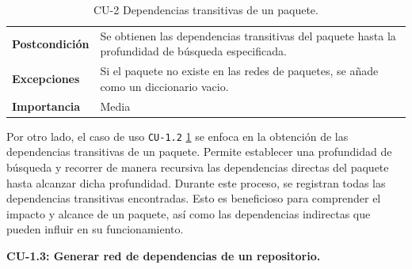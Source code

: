 \begin{table}[p]
\begin{tabularx}{\linewidth}{ p{} p{} }
		\textbf{Postcondición}        & Se obtienen las dependencias transitivas del paquete hasta la profundidad de búsqueda especificada.    \\
		\textbf{Excepciones}          & Si el paquete no existe en las redes de paquetes, se añade como un diccionario vacio.                  \\
		\textbf{Importancia}          & Media                                                                                                  \\
		\bottomrule
	\end{tabularx}
	\caption{CU-2 Dependencias transitivas de un paquete.}
	\label{tab:cu2}
\end{table}

Por otro lado, el caso de uso \texttt{CU-1.2} \ref{tab:cu2} se enfoca en la obtención de las dependencias transitivas de un paquete.
Permite establecer una profundidad de búsqueda y recorrer de manera recursiva las dependencias directas del
paquete hasta alcanzar dicha profundidad. Durante este proceso, se registran todas las dependencias transitivas
encontradas. Esto es beneficioso para comprender el impacto y alcance de un paquete, así como las dependencias
indirectas que pueden influir en su funcionamiento.


\textbf{CU-1.3: Generar red de dependencias de un repositorio.}

